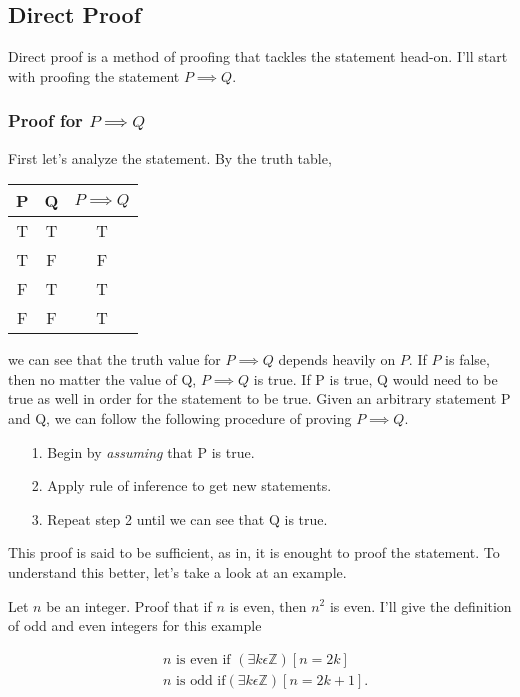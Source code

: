 \documentclass[a4paper]{article}
\begin{document}
\subsection{Direct Proof}
Direct proof is a method of proofing that tackles the statement head-on. I'll start with proofing the statement $P \implies Q$. 

\subsubsection{Proof for $P \implies Q$}

First let's analyze the statement. By the truth table, 

\begin{table}[htpb]
	\centering
	
	\label{tab:label}
	\begin{tabular}{cc|c}
		P & Q & $P \implies Q$ \\ \hline
		T & T & T \\
		T & F & F \\
		F & T & T \\
		F & F & T \\
	\end{tabular}
\end{table}we can see that the truth value for $P \implies Q$ depends heavily on $P$. If  $P$ is false, then no matter the value of Q, $P \implies Q$ is true. If P is true, Q would need to be true as well in order for the statement to be true. Given an arbitrary statement P and Q, we can follow the following procedure of proving $P \implies Q$.
\begin{itemize}
	\item[1.] Begin by \textit{assuming} that P is true.
	\item[2.] Apply rule of inference to get new statements.
	\item[3.] Repeat step 2 until we can see that Q is true.
\end{itemize}
This proof is said to be sufficient, as in, it is enought to proof the statement. To understand this better, let's take a look at an example.

\noindent Let $n$ be an integer. Proof that if  $n$ is even, then  $n^2$ is even.
I'll give the definition of odd and even integers for this example
\begin{tcolorbox}[title=Definition]
	\vspace{-15pt}
	\begin{align*}
		&n \text{ is even if } \left( \exists k \epsilon \mathbb{Z} \right)[n = 2k] \\
		&n \text{ is odd if} \left( \exists k \epsilon \mathbb{Z} \right)[n = 2k + 1] 
	.\end{align*}
\end{tcolorbox}
\end{document}
